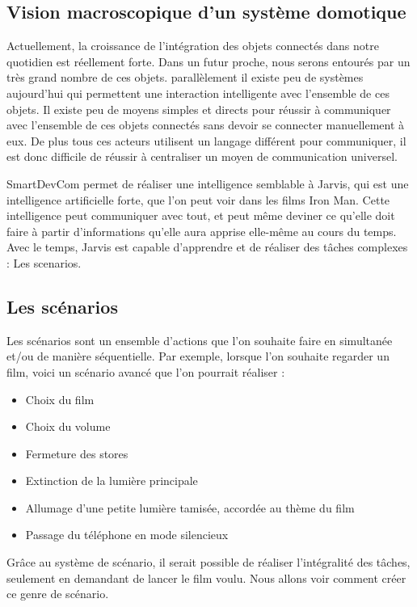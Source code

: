 	\subsection{Vision macroscopique d’un système domotique}
Actuellement, la croissance de l'intégration des objets connectés dans notre quotidien est réellement forte. 
Dans un futur proche, nous serons entourés par un très grand nombre de ces objets. parallèlement il existe 
peu de systèmes aujourd'hui qui permettent une interaction intelligente avec l'ensemble de ces objets. Il 
existe peu de moyens simples et directs pour réussir à communiquer avec l'ensemble de ces objets connectés 
sans devoir se connecter manuellement à eux. De plus tous ces acteurs utilisent un langage différent pour 
communiquer, il est donc difficile de réussir à centraliser un moyen de communication universel.

SmartDevCom permet de réaliser une intelligence semblable à Jarvis, qui est une intelligence 
artificielle forte, que l'on peut voir dans les films Iron Man. Cette intelligence peut communiquer 
avec tout, et peut même deviner ce qu'elle doit faire à partir d'informations qu'elle aura apprise 
elle-même au cours du temps. Avec le temps, Jarvis est capable d'apprendre et de réaliser des 
tâches complexes : Les scenarios.

	\subsection{Les scénarios}
Les scénarios sont un ensemble d'actions que l'on souhaite faire en simultanée et/ou de manière séquentielle. 
Par exemple, lorsque l'on souhaite regarder un film, voici un scénario avancé que l'on pourrait réaliser :
\begin{itemize}
 \item Choix du film
 \item Choix du volume
 \item Fermeture des stores
 \item Extinction de la lumière principale
 \item Allumage d'une petite lumière tamisée, accordée au thème du film
 \item Passage du téléphone en mode silencieux 
\end{itemize}

Grâce au système de scénario, il serait possible de réaliser l'intégralité des tâches, seulement en demandant de lancer le film voulu. Nous allons voir comment créer ce genre de scénario.
